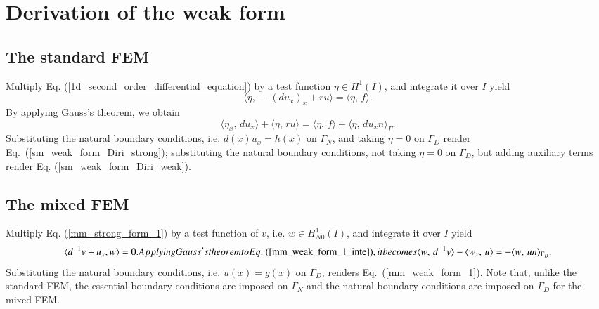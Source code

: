 \documentclass[review,3p]{elsarticle}
\begin{document}
\appendix

\section{Derivation of the weak form}		\label{weak form appendix}

\subsection{The standard FEM}		\label{derivation_weak_form_SM}

Multiply Eq. (\ref{1d_second_order_differential_equation}) by a test function $\eta \in H ^1 (I)$, and integrate it over $I$ yield
\begin{equation}
\langle \eta, \, -\left( d u_x \right)_x + ru \rangle = \langle \eta, \, f \rangle. \label{sm_weak_form_inte}
\end{equation}
By applying Gauss's theorem, we obtain
\begin{equation}
 \langle {\eta} _x, \, d u_x \rangle + \langle \eta, \, ru \rangle = \langle \eta, \, f \rangle + \langle \eta, \, d u_x n \rangle_{ {\Gamma}}.		\label{sm_weak_form_gauss}
\end{equation}
Substituting the natural boundary conditions, i.e. $d(x)u_x=h(x)$ on $\Gamma_N$, and taking $\eta=0$ on $\Gamma_{D}$ render Eq.~({\ref{sm_weak_form_Diri_strong}}); substituting the natural boundary conditions, not taking $\eta=0$ on $\Gamma_{D}$, but adding auxiliary terms render Eq. (\ref{sm_weak_form_Diri_weak}).

\subsection{The mixed FEM}		\label{derivation_weak_form_MM}
Multiply Eq. (\ref{mm_strong_form_1}) by a test function of $v$, i.e. $w \in H _{N0}^{1}(I)$, and integrate it over $I$ yield
\begin{subequations}
\begin{align}
  \langle d^{-1}v + u _x, w \rangle = 0.	\label{mm_weak_form_1_inte}
\end{align}
Applying Gauss's theorem to Eq.~(\ref{mm_weak_form_1_inte}), it becomes
\begin{align}
 \langle w, \, d^{-1}v \rangle - \langle w_x, \,  u \rangle = -\langle w, \, u n\rangle_{\Gamma _D}.		\label{mm_weak_form_1_gauss}
\end{align}%
\end{subequations}
Substituting the natural boundary conditions, i.e. $u(x)=g(x)$ on $\Gamma_D$, renders Eq.~({\ref{mm_weak_form_1}}). Note that, unlike the standard FEM, the essential boundary conditions are imposed on $\Gamma _N$ and the natural boundary conditions are imposed on $\Gamma _D$ for the mixed FEM.
\end{document}
